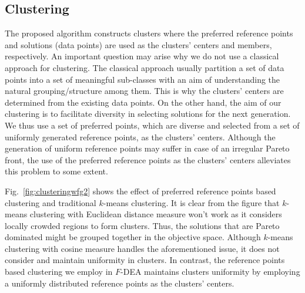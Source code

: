 \documentclass[review]{elsarticle}
\begin{document}
\subsection{Clustering}
\label{subsec:clustering}
The proposed algorithm constructs clusters where the preferred reference points and
solutions (data points) are used as the clusters' centers and members, respectively.
An important question may arise why we do not use a classical approach for clustering. The classical approach
usually partition a set of data points into a set of meaningful sub-classes with an aim of understanding the natural grouping/structure among them.
This is why the clusters' centers are determined from the existing data points. On the other hand, the aim of our clustering is to facilitate diversity in selecting solutions for the next generation. We thus use a set of preferred points, which are diverse and selected from a set of 
uniformly generated reference points, as the clusters' centers. Although the generation of uniform reference points may suffer in case of an irregular Pareto front, the use of the preferred reference points as the clusters' centers alleviates this problem to some extent. 

Fig.~\ref{fig:clusteringwfg2} shows the effect of preferred reference points based clustering and traditional $k$-means clustering. It is clear from the figure that $k$-means clustering with Euclidean distance measure won't work as it considers locally crowded regions to form clusters. Thus, the solutions that are Pareto dominated might be grouped together in 
the objective space. Although $k$-means clustering with cosine measure  handles the aforementioned issue, it does not consider and maintain uniformity in clusters. In contrast, the reference points based clustering we employ in $F$-DEA maintains clusters uniformity by employing a uniformly distributed reference points as the clusters' centers.
\end{document}
